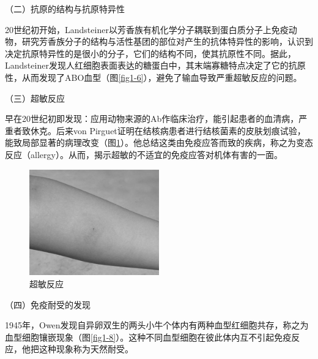 （二）抗原的结构与抗原特异性

20世纪初开始，Landsteiner以芳香族有机化学分子耦联到蛋白质分子上免疫动物，研究芳香族分子的结构与活性基团的部位对产生的抗体特异性的影响，认识到决定抗原特异性的是很小的分子，它们的结构不同，使其抗原性不同。据此，Landsteiner发现人红细胞表面表达的糖蛋白中，其末端寡糖特点决定了它的抗原性，从而发现了ABO血型（图\ref{fig1-6}），避免了输血导致严重超敏反应的问题。

（三）超敏反应

早在20世纪初即发现：应用动物来源的Ab作临床治疗，能引起患者的血清病，严重者致休克。后来von
Pirguet证明在结核病患者进行结核菌素的皮肤划痕试验，能致局部显著的病理改变（图\ref{fig1-7}）。他总结这类由免疫应答而致的疾病，称之为变态反应（allergy）。从而，揭示超敏的不适宜的免疫应答对机体有害的一面。

\begin{figure}[!htbp]
 \centering
 \includegraphics[width=0.5\textwidth]{./images/Image00014.jpg}
 \caption{超敏反应}
 \label{fig1-7}
  \end{figure} 

（四）免疫耐受的发现

1945年，Owen发现自异卵双生的两头小牛个体内有两种血型红细胞共存，称之为血型细胞镶嵌现象（图\ref{fig1-8}）。这种不同血型细胞在彼此体内互不引起免疫反应，他把这种现象称为天然耐受。

